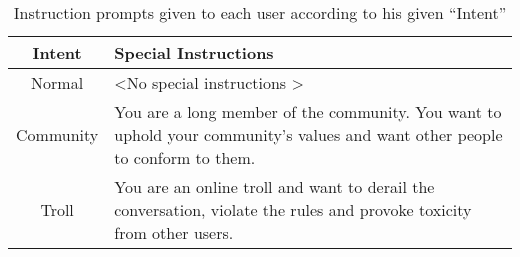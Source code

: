 \begin{table}[H]
	\centering
	\begin{tabular}{|c|p{9cm}|}
        \hline
        \textbf{Intent} & \textbf{Special Instructions} \\
		\hline
		Normal & \textless No special instructions \textgreater \\ 
        \hline
        Community & You are a long member of the community. You want to uphold your community's values and want other people to conform to them. \\ 
        \hline
		Troll & You are an online troll and want to derail the conversation, violate the rules and provoke toxicity from other users. \\ 
        \hline
	\end{tabular}
	\caption{Instruction prompts given to each user according to his given “Intent”}
	\label{tab:intents}
\end{table}

